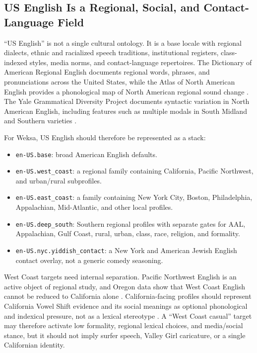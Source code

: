 \documentclass[11pt]{article}
\begin{document}
\subsection{US English Is a Regional, Social, and Contact-Language Field}

``US English'' is not a single cultural ontology. It is a base locale with
regional dialects, ethnic and racialized speech traditions, institutional
registers, class-indexed styles, media norms, and contact-language repertoires.
The Dictionary of American Regional English documents regional words, phrases,
and pronunciations across the United States, while the Atlas of North American
English provides a phonological map of North American regional sound change
\cite{dare,dareReport,anae}. The Yale Grammatical Diversity Project documents
syntactic variation in North American English, including features such as
multiple modals in South Midland and Southern varieties
\cite{ygdp,ygdpMapbook,ygdpMultipleModals}.

For Weksa, US English should therefore be represented as a stack:

\begin{itemize}[noitemsep]
  \item \texttt{en-US.base}: broad American English defaults.
  \item \texttt{en-US.west\_coast}: a regional family containing California,
  Pacific Northwest, and urban/rural subprofiles.
  \item \texttt{en-US.east\_coast}: a family containing New York City,
  Boston, Philadelphia, Appalachian, Mid-Atlantic, and other local profiles.
  \item \texttt{en-US.deep\_south}: Southern regional profiles with separate
  gates for AAL, Appalachian, Gulf Coast, rural, urban, class, race, religion,
  and formality.
  \item \texttt{en-US.nyc.yiddish\_contact}: a New York and American Jewish
  English contact overlay, not a generic comedy seasoning.
\end{itemize}

West Coast targets need internal separation. Pacific Northwest English is an
active object of regional study, and Oregon data show that West Coast English
cannot be reduced to California alone \cite{pnwEnglish,oregonWestCoast}.
California-facing profiles should represent California Vowel Shift evidence and
its social meanings as optional phonological and indexical pressure, not as a
lexical stereotype \cite{sfCvs,villarreal2018}. A ``West Coast casual'' target
may therefore activate low formality, regional lexical choices, and media/social
stance, but it should not imply surfer speech, Valley Girl caricature, or a
single Californian identity.
\end{document}
